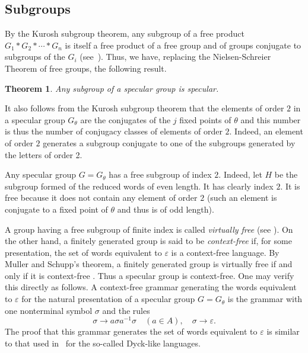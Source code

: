 \documentclass[preprint,12pt]{elsarticle}
\newtheorem{theorem}{Theorem}
\numberwithin{theorem}{section}
\numberwithin{equation}{section}
\numberwithin{figure}{section}
\numberwithin{table}{section}
\begin{document}
\subsection{Subgroups}
\label{subsec:sub}
By the Kurosh subgroup theorem, any subgroup of a free product $G_1*G_2*\cdots *G_n$ is itself a free product of a free group and of groups conjugate to subgroups of the $G_i$ (see~\cite{MagnusKarrassSolitar2004}).
Thus, we have, replacing  the Nielsen-Schreier Theorem of free groups, the following result.

\begin{theorem}
\label{theoremKurosh}
Any subgroup of a specular group is specular.
\end{theorem}

It also follows from the Kurosh subgroup theorem that the elements of order $2$ in a specular group $G_\theta$ are the conjugates of the $j$ fixed points of $\theta$ and this number is thus the number
of conjugacy classes of elements of order $2$.
Indeed, an element of order $2$ generates a subgroup conjugate to one of the subgroups generated by the letters of order 2.

Any specular group $G=G_\theta$ has a free subgroup of index $2$. Indeed, let
$H$ be the subgroup formed of the reduced words of even length. It has
clearly index $2$. It is free because it does not contain any element
of order $2$ (such an element is conjugate to a fixed point of $\theta$
and thus is of odd length). 

A group having a free subgroup of finite index is called \emph{virtually
free} (see \cite{Harpe2000}). On the other hand, a finitely generated group is
said to be \emph{context-free} if, for some presentation, the set
of words equivalent to $\varepsilon$ is a context-free language.
By Muller and Schupp's theorem,
a finitely generated group is virtually free if and only if
it is context-free \cite{MullerSchupp1983}. 
Thus a specular group is context-free. One may
verify this directly as follows. A
context-free grammar generating the words equivalent to $\varepsilon$ for the
natural presentation of a specular group $G=G_\theta$ is the
grammar with one nonterminal symbol $\sigma$ and the rules
\begin{displaymath}
\sigma\rightarrow a\sigma a^{-1}\sigma\quad (a\in A),\quad \sigma\rightarrow \varepsilon.
\end{displaymath}
The proof that this grammar generates the set of words
equivalent to $\varepsilon$ is similar to that used in~\cite{Berstel1979}
for the so-called Dyck-like languages.
\end{document}
